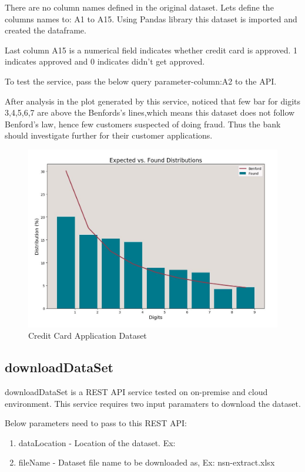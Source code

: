 There are no column names defined in the original dataset.
Lets define the columns names to:
A1 to A15. Using Pandas library this dataset
is imported and created the dataframe.

Last column A15 is a numerical field 
indicates whether credit card is approved. 
1 indicates approved and 0 indicates didn't 
get approved.

To test the service, pass the below query
parameter-column:A2 to the API.

After analysis in the plot generated by 
this service, noticed that few bar for 
digits 3,4,5,6,7 are above the Benfords's 
lines,which means this dataset does not 
follow Benford's law, hence few customers 
suspected of doing fraud. Thus the bank should 
investigate further for their customer applications.

\begin{figure}[!ht]
\centering\includegraphics[width=\columnwidth]{images/fraudDet_cc_data.JPG}
  \caption{Credit Card Application Dataset}\label{f:aust-cc-data}
\end{figure}


\subsection{downloadDataSet}
downloadDataSet is a REST API service tested on 
on-premise and cloud environment. This service requires two 
input paramaters to download the dataset.

Below parameters need to pass to this REST API:

\begin{enumerate}
\item dataLocation - Location of the dataset. 
 Ex:~\cite{hid-sp18-514-excelDatalocation}
\item fileName - Dataset file name to be downloaded 
 as, Ex: nsn-extract.xlsx
\end{enumerate}


